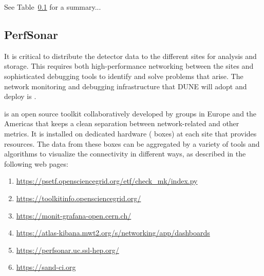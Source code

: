 \documentclass[../main-v1.tex]{subfiles}
\begin{document}
See Table~\ref{}  for a summary... 

\subsection{PerfSonar}

It is critical to distribute the detector data to the different sites for analysis and storage. This requires both high-performance networking between the sites and sophisticated debugging tools to identify and solve problems that arise. The  network monitoring and debugging infrastructure that DUNE will adopt and deploy is .

 is an open source toolkit collaboratively developed by %
groups in Europe and the Americas that keeps a clean separation between network-related and other metrics. %
It is installed on dedicated hardware ( boxes) at %
each site that provides resources. The data from these  boxes %
can be aggregated by a variety of tools and algorithms to %
visualize the connectivity in different ways, as described in the following web pages: %
\begin{enumerate}
    \item \url{https://psetf.opensciencegrid.org/etf/check_mk/index.py}
    \item \url{https://toolkitinfo.opensciencegrid.org/}
    \item \url{https://monit-grafana-open.cern.ch/}
    \item \url{https://atlas-kibana.mwt2.org/s/networking/app/dashboards}
    \item \url{https://perfsonar.uc.ssl-hep.org/}
    \item \url{https://sand-ci.org}
\end{enumerate}
\end{document}
